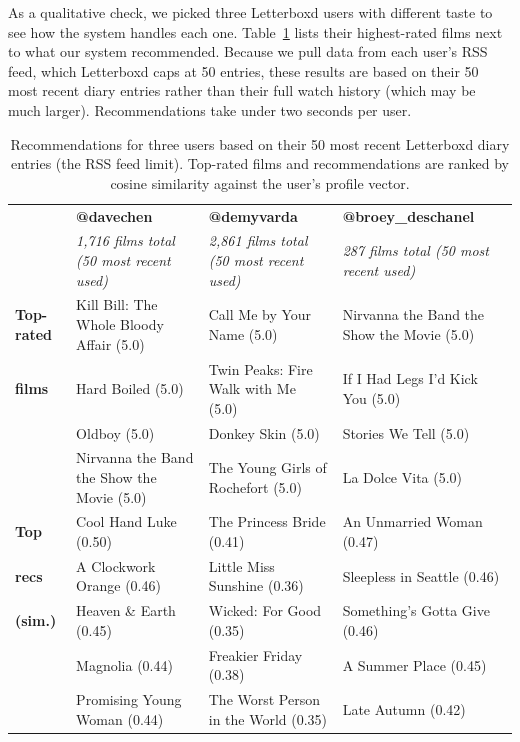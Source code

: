 \documentclass[sigconf,nonacm]{acmart}
\begin{document}
As a qualitative check, we picked three Letterboxd users with different taste to see how the system handles each one. Table~\ref{tab:recs} lists their highest-rated films next to what our system recommended. Because we pull data from each user's RSS feed, which Letterboxd caps at 50 entries, these results are based on their 50 most recent diary entries rather than their full watch history (which may be much larger). Recommendations take under two seconds per user.

\begin{table}[t]
\small
\begin{tabular}{llll}
\toprule
& \textbf{@davechen} & \textbf{@demyvarda} & \textbf{@broey\_deschanel} \\
& \textit{1,716 films total (50 most recent used)} & \textit{2,861 films total (50 most recent used)} & \textit{287 films total (50 most recent used)} \\
\midrule
\textbf{Top-rated} & Kill Bill: The Whole Bloody Affair (5.0) & Call Me by Your Name (5.0) & Nirvanna the Band the Show the Movie (5.0) \\
\textbf{films}     & Hard Boiled (5.0) & Twin Peaks: Fire Walk with Me (5.0) & If I Had Legs I'd Kick You (5.0) \\
                   & Oldboy (5.0) & Donkey Skin (5.0) & Stories We Tell (5.0) \\
                   & Nirvanna the Band the Show the Movie (5.0) & The Young Girls of Rochefort (5.0) & La Dolce Vita (5.0) \\
\midrule
\textbf{Top}          & Cool Hand Luke (0.50) & The Princess Bride (0.41) & An Unmarried Woman (0.47) \\
\textbf{recs}         & A Clockwork Orange (0.46) & Little Miss Sunshine (0.36) & Sleepless in Seattle (0.46) \\
\textbf{(sim.)}       & Heaven \& Earth (0.45) & Wicked: For Good (0.35) & Something's Gotta Give (0.46) \\
                      & Magnolia (0.44) & Freakier Friday (0.38) & A Summer Place (0.45) \\
                      & Promising Young Woman (0.44) & The Worst Person in the World (0.35) & Late Autumn (0.42) \\
\bottomrule
\end{tabular}
\caption{Recommendations for three users based on their 50 most recent Letterboxd diary entries (the RSS feed limit). Top-rated films and recommendations are ranked by cosine similarity against the user's profile vector.}
\label{tab:recs}
\end{table}
\end{document}
